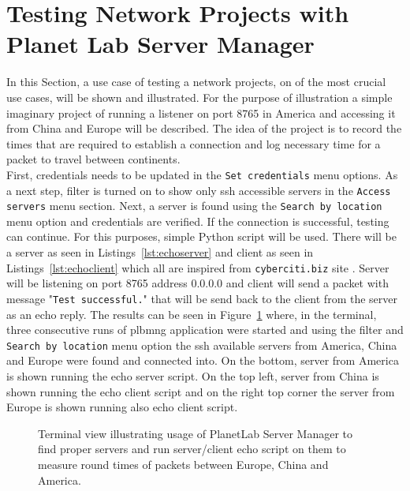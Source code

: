 {{{{{{{\section{Testing Network Projects with Planet Lab Server Manager}
\label{section:testing}
In this Section, a use case of testing a network projects, on of the most crucial use cases, will be shown and illustrated. For the purpose of illustration a simple imaginary project of running a listener on port 8765 in America and accessing it from China and Europe will be described. The idea of the project is to record the times that are required to establish a connection and log necessary time for a packet to travel between continents.\\
First, credentials needs to be updated in the \texttt{Set credentials} menu options. As a next step, filter is turned on to show only ssh accessible servers in the \texttt{Access servers} menu section. Next, a server is found using the \texttt{Search by location} menu option and credentials are verified. If the connection is successful, testing can continue. For this purposes, simple Python script will be used. There will be a server as seen in Listings~\ref{lst:echoserver} and client as seen in Listings~\ref{lst:echoclient} which all are inspired from \texttt{cyberciti.biz} site \cite{ports}. Server will be listening on port 8765 address 0.0.0.0 and client will send a packet with message "\texttt{Test successful.}" that will be send back to the client from the server as an echo reply. The results can be seen in Figure~\ref{fig:testingusecase} where, in the terminal, three consecutive runs of plbmng application were started and using the filter and \texttt{Search by location} menu option the ssh available servers from America, China and Europe were found and connected into. On the bottom, server from America is shown running the echo server script. On the top left, server from China is shown running the echo client script and on the right top corner the server from Europe is shown running also echo client script. 

\begin{figure}[H]
	\centering
	\caption{Terminal view illustrating usage of PlanetLab Server Manager to find proper servers and run server/client echo script on them to measure round times of packets between Europe, China and America.}
	\label{fig:testingusecase}
\end{figure}

}}}}}}}
